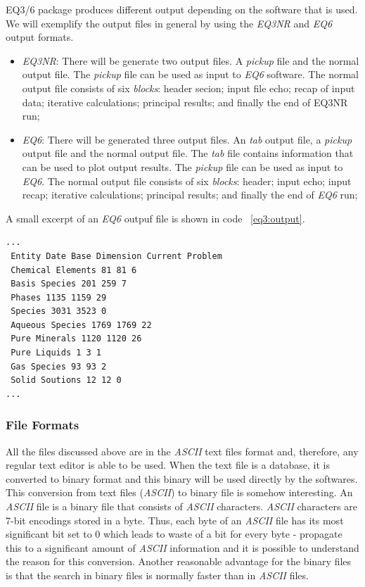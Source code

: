 \documentclass[ppgc,mestrado,english]{iiufrgs}
\begin{document}
EQ3/6 package produces different output depending on the software that is used. We will exemplify the output files in general by using the \emph{EQ3NR} and \emph{EQ6} output formats. 
\begin{itemize}
\item \emph{EQ3NR}: There will be generate two output files. A \emph{pickup} file and the normal output file. The \emph{pickup} file can be used as input to \emph{EQ6} software. The normal output file consists of six \emph{blocks}: header secion; input file echo; recap of input data; iterative calculations; principal results; and finally the end of EQ3NR run;
\item \emph{EQ6}: There will be generated three output files. An \emph{tab} output file, a \emph{pickup} output file and the normal output file. The \emph{tab} file contains information that can be used to plot output results. The \emph{pickup} file can be used as input to \emph{EQ6}. The normal output file consists of six \emph{blocks}: header; input echo; input recap; iterative calculations; principal results; and finally the end of \emph{EQ6} run; 
\end{itemize}

A small excerpt of an \emph{EQ6} outpuf file is shown in code ~\ref{eq3:output}.

\begin{lstlisting}[frame=single, caption=Excerpt of \emph{EQ6} output file, label=eq3:output]
...
 Entity Date Base Dimension Current Problem
 Chemical Elements 81 81 6
 Basis Species 201 259 7
 Phases 1135 1159 29
 Species 3031 3523 0
 Aqueous Species 1769 1769 22
 Pure Minerals 1120 1120 26
 Pure Liquids 1 3 1
 Gas Species 93 93 2
 Solid Soutions 12 12 0
...
\end{lstlisting}


\subsubsection{File Formats}

All the files discussed above are in the \emph{ASCII} text files format and, therefore, any regular text editor is able to be used. When the text file is a database, it is converted to binary format and this binary will be used directly by the softwares. This conversion from text files (\emph{ASCII}) to binary file is somehow interesting. An \emph{ASCII} file is a binary file that consists of \emph{ASCII} characters. \emph{ASCII} characters are 7-bit encodings stored in a byte. Thus, each byte of an \emph{ASCII} file has its most significant bit set to 0 which leads to waste of a bit for every byte - propagate this to a significant amount of \emph{ASCII} information and it is possible to understand the reason for this conversion. Another reasonable advantage for the binary files is that the search in binary files is normally faster than in \emph{ASCII} files.
\end{document}
